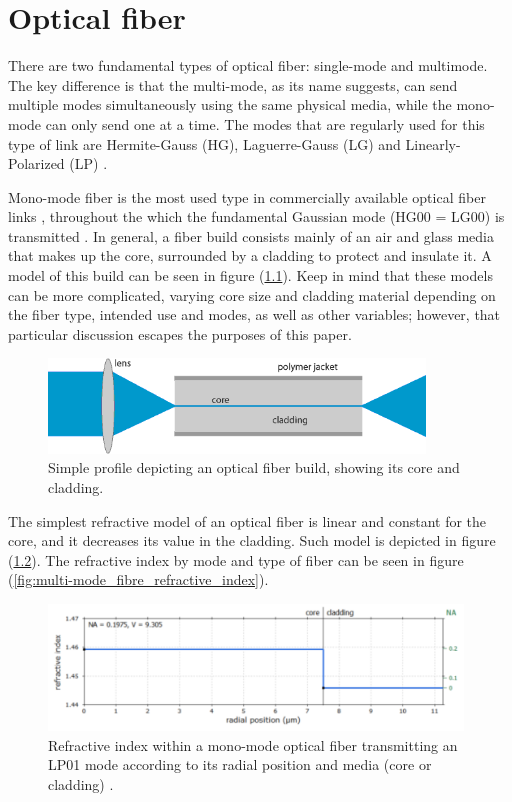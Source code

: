 \chapter{Optical fiber}
\label{FiberOptics}

There are two fundamental types of optical fiber: single-mode and multimode. The key difference is that the multi-mode, as its name suggests, can send multiple modes simultaneously using the same physical media, while the mono-mode can only send one at a time. The modes that are regularly used for this type of link are Hermite-Gauss (HG), Laguerre-Gauss (LG) and Linearly-Polarized (LP) \cite{FiberOptics_Modes}.

Mono-mode fiber is the most used type in commercially available optical fiber links \cite{Single-Mode_Fiber_Optic}, throughout the which the fundamental Gaussian mode (HG00 = LG00) is transmitted \cite{LP_Modes}. In general, a fiber build consists mainly of an air and glass media that makes up the core, surrounded by a cladding to protect and insulate it. A model of this build can be seen in figure (\ref{fig:fiber_profile}). Keep in mind that these models can be more complicated, varying core size and cladding material depending on the fiber type, intended use and modes, as well as other variables; however, that particular discussion escapes the purposes of this paper.

\begin{figure}[htbp]
    \centering
    \includegraphics[width=10cm]{images/Appendices/fiber.png}
    \caption{Simple profile depicting an optical fiber build, showing its core and cladding.}
    \label{fig:fiber_profile}
\end{figure}

The simplest refractive model of an optical fiber is linear and constant for the core, and it decreases its value in the cladding. Such model is depicted in figure (\ref{fig:single-mode_fibre_refractive_index}). The refractive index by mode and type of fiber can be seen in figure (\ref{fig:multi-mode_fibre_refractive_index}).

\begin{figure}[htbp]
    \centering
    \includegraphics[width=11cm]{images/Appendices/step_index_fiber.png}
    \caption{Refractive index within a mono-mode optical fiber transmitting an LP01 mode according to its radial position and media (core or cladding) \protect\cite{Single-Mode_Fiber_Optic}.}
    \label{fig:single-mode_fibre_refractive_index}
\end{figure}

